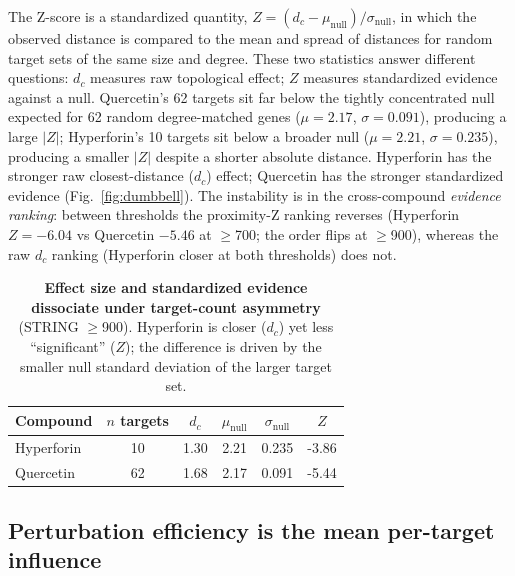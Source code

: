 The Z-score is a standardized quantity, $Z = (d_c - \mu_{\text{null}})/\sigma_{\text{null}}$, in which the observed distance is compared to the mean and spread of distances for random target sets of the same size and degree. These two statistics answer different questions: $d_c$ measures raw topological effect; $Z$ measures standardized evidence against a null. Quercetin's 62 targets sit far below the tightly concentrated null expected for 62 random degree-matched genes ($\mu = 2.17$, $\sigma = 0.091$), producing a large $|Z|$; Hyperforin's 10 targets sit below a broader null ($\mu = 2.21$, $\sigma = 0.235$), producing a smaller $|Z|$ despite a shorter absolute distance. Hyperforin has the stronger raw closest-distance ($d_c$) effect; Quercetin has the stronger standardized evidence (Fig.~\ref{fig:dumbbell}). The instability is in the cross-compound \textit{evidence ranking}: between thresholds the proximity-Z ranking reverses (Hyperforin $Z = -6.04$ vs Quercetin $-5.46$ at $\geq$700; the order flips at $\geq$900), whereas the raw $d_c$ ranking (Hyperforin closer at both thresholds) does not.

\begin{table}[ht]
\centering
\caption{\textbf{Effect size and standardized evidence dissociate under target-count asymmetry} (STRING $\geq$900). Hyperforin is closer ($d_c$) yet less ``significant'' ($Z$); the difference is driven by the smaller null standard deviation of the larger target set.}
\label{tab:effevid}
\begin{tabular}{@{}l S[table-format=2.0] S[table-format=1.2] S[table-format=1.2] S[table-format=1.3] S[table-format=-1.2]@{}}
\toprule
\textbf{Compound} & {\textbf{$n$ targets}} & {\textbf{$d_c$}} & {\textbf{$\mu_{\text{null}}$}} & {\textbf{$\sigma_{\text{null}}$}} & {\textbf{$Z$}} \\
\midrule
Hyperforin & 10 & 1.30 & 2.21 & 0.235 & -3.86 \\
Quercetin  & 62 & 1.68 & 2.17 & 0.091 & -5.44 \\
\bottomrule
\end{tabular}
\end{table}



\subsection{Perturbation efficiency is the mean per-target influence}

